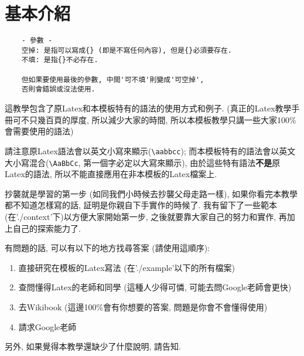 \section{基本介紹}

  \begin{framed}
  \begin{verbatim}
    - 參數 -
    空掉: 是指可以寫成{} (即是不寫任何內容), 但是{}必須要存在.
    不填: 是指{}不必存在.

    但如果要使用最後的參數, 中間'可不填'則變成'可空掉',
    否則會錯誤或沒法使用.
  \end{verbatim}
  \end{framed}

這教學包含了原Latex和本模板特有的語法的使用方式和例子. (真正的Latex教學手冊可不只幾百頁的厚度, 所以減少大家的時間, 所以本模板教學只講一些大家100\%會需要使用的語法)

請注意原Latex語法會以英文小寫來顯示(\verb|\aabbcc|); 而本模板特有的語法會以英文大小寫混合(\verb|\AaBbCc|, 第一個字必定以大寫來顯示), 由於這些特有語法\textbf{不是}原Latex的語法, 所以不能直接應用在非本模板的Latex檔案上.

抄襲就是學習的第一步 (如同我們小時候去抄襲父母走路一樣), 如果你看完本教學都不知道怎樣寫的話, 証明是你親自下手實作的時候了. 我有留下了一些範本 (在'./context'下)以方便大家開始第一步, 之後就要靠大家自己的努力和實作, 再加上自己的探索能力了.

有問題的話, 可以有以下的地方找尋答案 (請使用這順序):
\begin{enumerate}
\item 直接研究在模板的Latex寫法 (在'./example'以下的所有檔案)
\item 查問懂得Latex的老師和同學 (這種人少得可憐, 可能去問Google老師會更快)
\item 去Wikibook (這邊100\%會有你想要的答案, 問題是你會不會懂得使用)
\item 請求Google老師
\end{enumerate}

另外, 如果覺得本教學還缺少了什麼說明, 請告知.

\EndChapter
